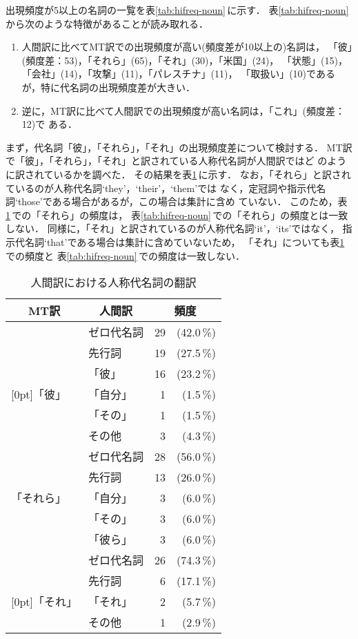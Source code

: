 出現頻度が5以上の名詞の一覧を表\ref{tab:hifreq-noun}\,に示す．
表\ref{tab:hifreq-noun}\,から次のような特徴があることが読み取れる．
\begin{enumerate}
\item\label{enum:noun:pronoun}
人間訳に比べてMT訳での出現頻度が高い(頻度差が10以上の)名詞は，
「彼」(頻度差：53)，「それら」(65)，「それ」(30)，「米国」(24)，
「状態」(15)，「会社」(14)，「攻撃」(11)，「パレスチナ」(11)，
「取扱い」(10)であるが，特に代名詞の出現頻度差が大きい．
\item\label{enum:noun:anaph}
逆に，MT訳に比べて人間訳での出現頻度が高い名詞は，「これ」(頻度差：12)で
ある．
\end{enumerate}

まず，代名詞「彼」，「それら」，「それ」の出現頻度差について検討する．
MT訳で「彼」，「それら」，「それ」と訳されている人称代名詞が人間訳ではど
のように訳されているかを調べた．
その結果を表\ref{tab:pron-hum}\,に示す．
なお，「それら」と訳されているのが人称代名詞`they'，`their'，`them'では
なく，定冠詞や指示代名詞`those'である場合があるが，この場合は集計に含め
ていない． 
このため，表\ref{tab:pron-hum}\,での「それら」の頻度は，
表\ref{tab:hifreq-noun}\,での「それら」の頻度とは一致しない．
同様に，「それ」と訳されているのが人称代名詞`it'，`its'ではなく，
指示代名詞`that'である場合は集計に含めていないため，
「それ」についても表\ref{tab:pron-hum}\,での頻度と
表\ref{tab:hifreq-noun}\,での頻度は一致しない．
\begin{table}[htbp]
\caption{人間訳における人称代名詞の翻訳}
\label{tab:pron-hum}
\begin{center}
\begin{tabular}{|l||l|r@{}r|}\hline
\multicolumn{1}{|c||}{MT訳} & \multicolumn{1}{c|}{人間訳} & 
\multicolumn{2}{c|}{頻度} \\\hline\hline
& ゼロ代名詞 & 29 & (42.0\,\%) \\
& 先行詞   & 19 & (27.5\,\%) \\
& 「彼」     & 16 & (23.2\,\%) \\
\raisebox{1.5ex}[0pt]{「彼」} 
& 「自分」 &  1 &  (1.5\,\%) \\
& 「その」 &  1 &  (1.5\,\%) \\
& その他   &  3 &  (4.3\,\%) \\\hline
           & ゼロ代名詞 & 28 & (56.0\,\%) \\
           & 先行詞   & 13 & (26.0\,\%) \\
「それら」 & 「自分」   &  3 & (6.0\,\%) \\
           & 「その」   &  3 & (6.0\,\%) \\
           & 「彼ら」   &  3 & (6.0\,\%) \\\hline
& ゼロ代名詞 & 26 &  (74.3\,\%) \\
& 先行詞   &  6 &  (17.1\,\%) \\
\raisebox{1.5ex}[0pt]{「それ」} 
& 「それ」   &  2 &  (5.7\,\%) \\
& その他     &  1 &  (2.9\,\%) \\\hline
\end{tabular}
\end{center}
\end{table}


